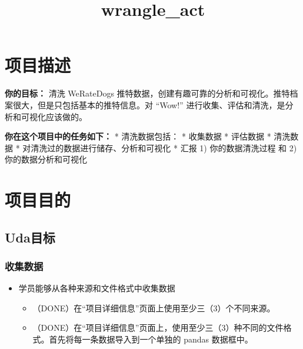 \documentclass[11pt]{article}
\title{wrangle\_act}
\providecommand{\tightlist}{%
      \setlength{\itemsep}{0pt}\setlength{\parskip}{0pt}}
\begin{document}
    
    
    \maketitle
    
    

    
    \hypertarget{ux9879ux76eeux63cfux8ff0}{%
\section{项目描述}\label{ux9879ux76eeux63cfux8ff0}}

\textbf{你的目标：} 清洗 WeRateDogs
推特数据，创建有趣可靠的分析和可视化。推特档案很大，但是只包括基本的推特信息。对
``Wow!'' 进行收集、评估和清洗，是分析和可视化应该做的。

\textbf{你在这个项目中的任务如下：} * 清洗数据包括： * 收集数据 *
评估数据 * 清洗数据 * 对清洗过的数据进行储存、分析和可视化 * 汇报 1)
你的数据清洗过程 和 2) 你的数据分析和可视化

\hypertarget{ux9879ux76eeux76eeux7684}{%
\section{项目目的}\label{ux9879ux76eeux76eeux7684}}

\hypertarget{udaux76eeux6807}{%
\subsection{Uda目标}\label{udaux76eeux6807}}

\hypertarget{ux6536ux96c6ux6570ux636e}{%
\subsubsection{收集数据}\label{ux6536ux96c6ux6570ux636e}}

\begin{itemize}
\tightlist
\item
  学员能够从各种来源和文件格式中收集数据

  \begin{itemize}
  \tightlist
  \item
    （DONE）在``项目详细信息''页面上使用至少三（3）个不同来源。
  \item
    （DONE）在``项目详细信息''页面上，使用至少三（3）种不同的文件格式。首先将每一条数据导入到一个单独的
    pandas 数据框中。
  \end{itemize}
\end{itemize}
\end{document}
